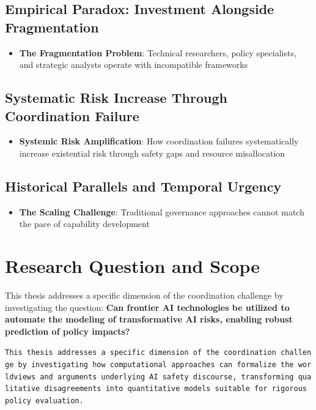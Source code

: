 \documentclass[]{book}
\providecommand{\tightlist}{%
  \setlength{\itemsep}{0pt}\setlength{\parskip}{0pt}}
\begin{document}
\subsection{Empirical Paradox: Investment Alongside
Fragmentation}\label{sec-empirical-paradox}

\begin{itemize}
\tightlist
\item
  \textbf{The Fragmentation Problem}: Technical researchers, policy
  specialists, and strategic analysts operate with incompatible
  frameworks
\end{itemize}

\subsection{Systematic Risk Increase Through Coordination
Failure}\label{sec-risk-increase}

\begin{itemize}
\tightlist
\item
  \textbf{Systemic Risk Amplification}: How coordination failures
  systematically increase existential risk through safety gaps and
  resource misallocation
\end{itemize}

\subsection{Historical Parallels and Temporal
Urgency}\label{sec-historical-parallels}

\begin{itemize}
\tightlist
\item
  \textbf{The Scaling Challenge}: Traditional governance approaches
  cannot match the pace of capability development
\end{itemize}

\section{Research Question and Scope}\label{sec-research-question}

This thesis addresses a specific dimension of the coordination challenge
by investigating the question: \textbf{Can frontier AI technologies be
utilized to automate the modeling of transformative AI risks, enabling
robust prediction of policy impacts?}

\texttt{This\ thesis\ addresses\ a\ specific\ dimension\ of\ the\ coordination\ challenge\ by\ investigating\ how\ computational\ approaches\ can\ formalize\ the\ worldviews\ and\ arguments\ underlying\ AI\ safety\ discourse,\ transforming\ qualitative\ disagreements\ into\ quantitative\ models\ suitable\ for\ rigorous\ policy\ evaluation.}
\end{document}
